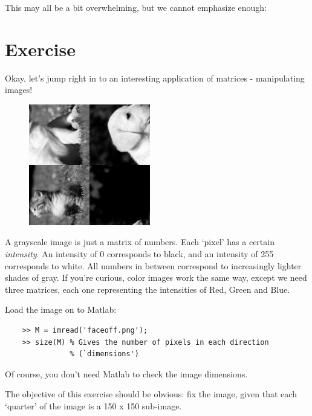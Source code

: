 \documentclass{article}
\begin{document}
\pagebreak

This may all be a bit overwhelming, but we cannot emphasize enough:

\section*{Exercise}

Okay, let's jump right in to an interesting application of
matrices - manipulating images!

\begin{figure}[h]
\begin{center}
\includegraphics[height=150pt]{figures/faceoff.png}
\end{center}
\end{figure}

A grayscale image is just a matrix of numbers. Each `pixel' has
a certain \emph{intensity}. An intensity of 0 corresponds to black,
and an intensity of 255 corresponds to white. All numbers in between
correspond to increasingly lighter shades of gray. If you're curious,
color images work the same way, except we need three matrices, each
one representing the intensities of Red, Green and Blue.

Load the image on to Matlab:

\begin{verbatim}
    >> M = imread('faceoff.png');
    >> size(M) % Gives the number of pixels in each direction 
               % (`dimensions')
\end{verbatim}

Of course, you don't need Matlab to check the image dimensions.

The objective of this exercise should be obvious: fix the image, given that
each `quarter' of the image is a 150 x 150 sub-image.
\end{document}

